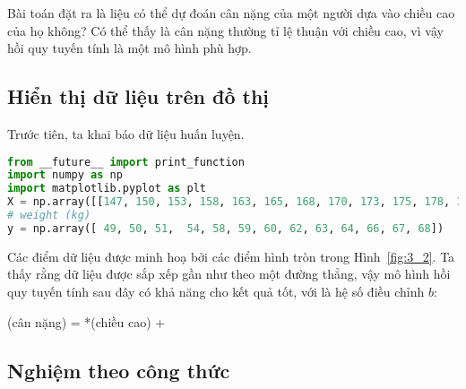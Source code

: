 Bài toán đặt ra là liệu có thể dự đoán cân nặng của một người dựa vào chiều cao
của họ không? Có thể thấy là cân nặng thường tỉ lệ thuận với chiều cao, vì vậy hồi quy tuyến tính là một mô hình phù hợp. 



\subsection{Hiển thị dữ liệu trên đồ thị}
Trước tiên, ta khai báo dữ liệu huấn luyện.
\begin{lstlisting}[language=Python]
from __future__ import print_function 
import numpy as np 
import matplotlib.pyplot as plt
X = np.array([[147, 150, 153, 158, 163, 165, 168, 170, 173, 175, 178, 180, 183]]).T  # height (cm), input data, each row is a data point 
# weight (kg)
y = np.array([ 49, 50, 51,  54, 58, 59, 60, 62, 63, 64, 66, 67, 68])
\end{lstlisting}



Các điểm dữ liệu được minh hoạ bởi các điểm hình tròn trong Hình~\ref{fig:3_2}.
Ta thấy rằng dữ liệu được sắp xếp gần như theo một đường thẳng, vậy mô hình hồi
quy tuyến tính sau đây có khả năng cho kết quả tốt, với  là
hệ số điều chỉnh $b$:
\begin{center}
(cân nặng) = *(chiều cao) + 
\end{center}


\subsection{Nghiệm theo công thức}

